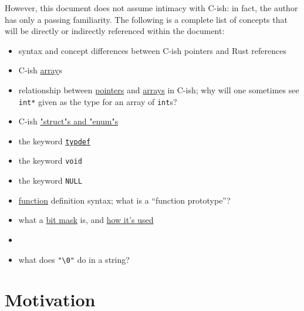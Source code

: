 \documentclass[12pt,letterpaper]{article}
\newcommand{\inquotes}[1]{``#1''}	%
\newcommand{\cil}[1]{\texttt{#1}}
\begin{document}
    However, this document does not assume intimacy with C-ish: in fact, the author has only a passing familiarity. The following is a complete list of concepts that will be directly or indirectly referenced within the document:
		\begin{itemize}
            \item syntax and concept differences between C-ish pointers and Rust references
            
			\item C-ish \href{https://en.wikibooks.org/wiki/C_Programming/Arrays_and_strings}{array}s
            
            \item relationship between  \href{https://en.wikibooks.org/wiki/C_Programming/Pointers_and_arrays}{pointers} and \href{https://en.wikibooks.org/wiki/C_Programming/Pointers_and_arrays#Pointers_and_Arrays}{arrays} in C-ish; why will one sometimes see \cil{int*} given as the type for an array of \cil{int}s?
            
            \item C-ish \href{https://en.wikibooks.org/wiki/C_Programming/Advanced_data_types}{"struct"s and "enum"s}
            
            \item the keyword \href{https://en.wikibooks.org/wiki/C_Programming/Advanced_data_types}{\cil{typdef}}
			
            \item the keyword \cil{void}
            
            \item the keyword \cil{NULL}
            
			\item \href{https://en.wikibooks.org/wiki/C_Programming/Procedures_and_functions}{function} definition syntax; what is a \inquotes{function prototype}? 
			
			\item what a \href{https://en.wikipedia.org/wiki/Mask_(computing)}{bit mask} is, and \href{https://stackoverflow.com/questions/10493411/what-is-bit-masking}{how it's used}
            
            \item \item what does \texttt{"\textbackslash0"} do in a string? 
		\end{itemize}
   
\section{Motivation}
\end{document}
